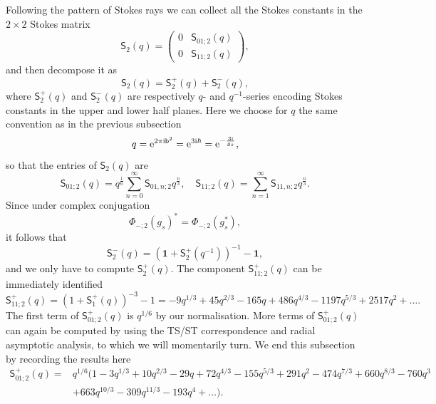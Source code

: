 \documentclass[a4paper,11pt]{article}
\theoremstyle{definition}
\newcommand{\re}{{\rm e}}
\newcommand{\ri}{{\rm i}}
\newcommand{\bb}{\mathsf{b}}
\newcommand{\nn}{\nonumber \\}
\def\md{\mathbf}
\def\ms{\mathsf}
\begin{document}
Following the pattern of Stokes rays we can collect all the Stokes
constants in the $2\times 2$ Stokes matrix
\begin{equation}
  \ms{S}_2(q) =
  \begin{pmatrix}
    0 & \ms{S}_{01;2}(q)\\
    0 & \ms{S}_{11;2}(q)
  \end{pmatrix},
\end{equation}
and then decompose it as
\begin{equation}
  \ms{S}_2(q) = \ms{S}_2^+(q) + \ms{S}_2^-(q),
\end{equation}
where $\ms{S}_2^+(q)$ and $\ms{S}_2^-(q)$ are respectively $q$- and
$q^{-1}$-series encoding Stokes constants in the upper and lower half
planes.
Here we choose for $q$ the same convention as in the previous subsection
%
\begin{equation}
  q = \re^{2\pi\ri \bb^2} = \re^{3\ri\hbar}= \re^{-\frac{3\ri}{g_s}},
\end{equation}
%
so that the entries of $\ms{S}_2(q)$ are
%
\begin{equation}
  \ms{S}_{01;2}(q) = q^{\frac{1}{6}}\sum_{n=0}^\infty
  \ms{S}_{01,n;2}q^{\frac{n}{3}},
  \quad
  \ms{S}_{11;2}(q) = \sum_{n=1}^\infty
  \ms{S}_{11,n;2}q^{\frac{n}{3}}.
\end{equation}
%
Since under complex conjugation
%
\begin{equation}
  \Phi_{-;2}(g_s)^* = \Phi_{-;2}(g_s^*),
\end{equation}
it follows that
\begin{equation}
  \ms{S}_2^-(q) = (\md{1}+\ms{S}_2^+(q^{-1}))^{-1} - \md{1},
  \label{eq:S2mp}
\end{equation}
and we only have to compute $\ms{S}_2^+(q)$.  The component
$\ms{S}^+_{11;2}(q)$ can be immediately identified
\begin{equation}
  \ms{S}^+_{11;2}(q) = (1+\ms{S}^+_{1}(q))^{-3}-1 =
  - 9q^{1/3}+45q^{2/3}-165q+486q^{4/3}-1197 q^{5/3} + 2517 q^2
  +\ldots.
\end{equation}
The first term of $\ms{S}^+_{01;2}(q)$ is $q^{1/6}$ by our
normalisation.  More terms of $\ms{S}^+_{01;2}(q)$ can again be
computed by using the TS/ST correspondence and radial asymptotic
analysis, to which we will momentarily turn.  We end this subsection
by recording the results here
\begin{align}
  \ms{S}^+_{01;2}(q) =
  &q^{1/6}(1 - 3q^{1/3} + 10q^{2/3} - 29q + 72q^{4/3}
  -155 q^{5/3} + 291 q^2 - 474 q^{7/3} + 660 q^{8/3} - 760 q^3 \nn
  &+  663q^{10/3} -309 q^{11/3}- 193 q^4 + \ldots).
    \label{eq:S01-P2}
\end{align}
\end{document}
